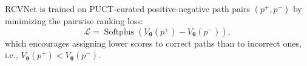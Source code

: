 \documentclass{article}
\newcommand{\jy}[1]{\textcolor{red}{[JY: #1]}}
\theoremstyle{plain}
\theoremstyle{definition}
\theoremstyle{remark}
\begin{document}


RCVNet is trained on PUCT-curated positive-negative path pairs $(p^+, p^-)$ by minimizing the pairwise ranking loss:
\begin{equation}
\mathcal{L} = \operatorname{Softplus}\left(V_{\bm\theta}(p^+) - V_{\bm\theta}(p^-)\right),
\label{eq:ranking_loss}
\end{equation}
which encourages assigning lower scores 
to correct paths than to incorrect ones, i.e., $V_{\bm\theta}(p^+) < V_{\bm\theta}(p^-)$.
\end{document}
